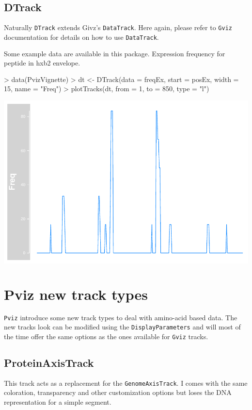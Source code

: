 \documentclass[11pt]{article}
\begin{document}
\subsection{DTrack}
Naturally \texttt{DTrack} extends Givz's \texttt{DataTrack}. Here again, please
refer to \texttt{Gviz} documentation for details on how to use
\texttt{DataTrack}.

Some example data are available in this package. Expression frequency for
peptide in hxb2 envelope.
\begin{Schunk}
\begin{Sinput}
> data(PvizVignette)
> dt <- DTrack(data = freqEx, start = posEx, width = 15, name = "Freq")
> plotTracks(dt, from = 1, to = 850, type = "l")
\end{Sinput}
\end{Schunk}
\includegraphics{Pviz-DTrack-example}


\section{Pviz new track types}
\texttt{Pviz} introduce some new track types to deal with amino-acid based data.
The new tracks look can be modified using the \texttt{DisplayParameters} and
will most of the time offer the same options as the ones available for
\texttt{Gviz} tracks.

\subsection{ProteinAxisTrack}
This track acts as a replacement for the \texttt{GenomeAxisTrack}. I comes
with the same coloration, transparency and other customization options but loses
the DNA representation for a simple segment.
\end{document}
